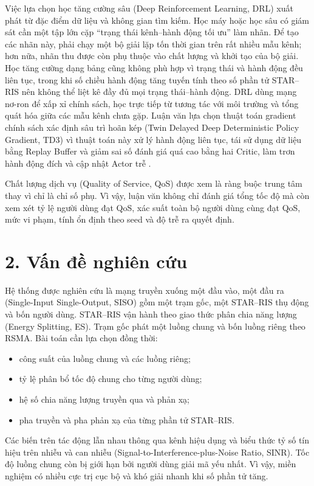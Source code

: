 Việc lựa chọn học tăng cường sâu (Deep Reinforcement Learning, DRL) xuất phát từ đặc điểm dữ liệu và không gian tìm kiếm. Học máy hoặc học sâu có giám sát cần một tập lớn cặp ``trạng thái kênh--hành động tối ưu'' làm nhãn. Để tạo các nhãn này, phải chạy một bộ giải lặp tốn thời gian trên rất nhiều mẫu kênh; hơn nữa, nhãn thu được còn phụ thuộc vào chất lượng và khởi tạo của bộ giải. Học tăng cường dạng bảng cũng không phù hợp vì trạng thái và hành động đều liên tục, trong khi số chiều hành động tăng tuyến tính theo số phần tử STAR--RIS nên không thể liệt kê đầy đủ mọi trạng thái--hành động. DRL dùng mạng nơ-ron để xấp xỉ chính sách, học trực tiếp từ tương tác với môi trường và tổng quát hóa giữa các mẫu kênh chưa gặp. Luận văn lựa chọn thuật toán gradient chính sách xác định sâu trì hoãn kép (Twin Delayed Deep Deterministic Policy Gradient, TD3) vì thuật toán này xử lý hành động liên tục, tái sử dụng dữ liệu bằng Replay Buffer và giảm sai số đánh giá quá cao bằng hai Critic, làm trơn hành động đích và cập nhật Actor trễ \cite{Fujimoto2018TD3}.

Chất lượng dịch vụ (Quality of Service, QoS) được xem là ràng buộc trung tâm thay vì chỉ là chỉ số phụ. Vì vậy, luận văn không chỉ đánh giá tổng tốc độ mà còn xem xét tỷ lệ người dùng đạt QoS, xác suất toàn bộ người dùng cùng đạt QoS, mức vi phạm, tính ổn định theo seed và độ trễ ra quyết định.

\section*{2. Vấn đề nghiên cứu}
Hệ thống được nghiên cứu là mạng truyền xuống một đầu vào, một đầu ra (Single-Input Single-Output, SISO) gồm một trạm gốc, một STAR--RIS thụ động và bốn người dùng. STAR--RIS vận hành theo giao thức phân chia năng lượng (Energy Splitting, ES). Trạm gốc phát một luồng chung và bốn luồng riêng theo RSMA. Bài toán cần lựa chọn đồng thời:
\begin{itemize}
  \item công suất của luồng chung và các luồng riêng;
  \item tỷ lệ phân bổ tốc độ chung cho từng người dùng;
  \item hệ số chia năng lượng truyền qua và phản xạ;
  \item pha truyền và pha phản xạ của từng phần tử STAR--RIS.
\end{itemize}

Các biến trên tác động lẫn nhau thông qua kênh hiệu dụng và biểu thức tỷ số tín hiệu trên nhiễu và can nhiễu (Signal-to-Interference-plus-Noise Ratio, SINR). Tốc độ luồng chung còn bị giới hạn bởi người dùng giải mã yếu nhất. Vì vậy, miền nghiệm có nhiều cực trị cục bộ và khó giải nhanh khi số phần tử tăng.

